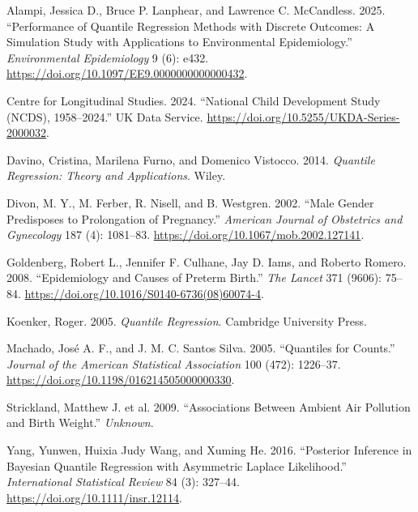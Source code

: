 \documentclass[
  letterpaper,
  DIV=11,
  numbers=noendperiod]{scrartcl}
\newlength{\cslhangindent}
\newenvironment{CSLReferences}[2] %
 {\begin{list}{}{%
  \setlength{\itemindent}{0pt}
  \setlength{\leftmargin}{0pt}
  \setlength{\parsep}{0pt}
  \ifodd #1
   \setlength{\leftmargin}{\cslhangindent}
   \setlength{\itemindent}{-1\cslhangindent}
  \fi
  \setlength{\itemsep}{#2\baselineskip}}}
 {\end{list}}
\begin{document}
\protect{}\label{refs}
\begin{CSLReferences}{1}{1}
Alampi, Jessica D., Bruce P. Lanphear, and Lawrence C. McCandless. 2025.
{``Performance of Quantile Regression Methods with Discrete Outcomes: A
Simulation Study with Applications to Environmental Epidemiology.''}
\emph{Environmental Epidemiology} 9 (6): e432.
\url{https://doi.org/10.1097/EE9.0000000000000432}.

Centre for Longitudinal Studies. 2024. {``National Child Development
Study (NCDS), 1958--2024.''} UK Data Service.
\url{https://doi.org/10.5255/UKDA-Series-2000032}.

Davino, Cristina, Marilena Furno, and Domenico Vistocco. 2014.
\emph{Quantile Regression: Theory and Applications}. Wiley.

Divon, M. Y., M. Ferber, R. Nisell, and B. Westgren. 2002. {``Male
Gender Predisposes to Prolongation of Pregnancy.''} \emph{American
Journal of Obstetrics and Gynecology} 187 (4): 1081--83.
\url{https://doi.org/10.1067/mob.2002.127141}.

Goldenberg, Robert L., Jennifer F. Culhane, Jay D. Iams, and Roberto
Romero. 2008. {``Epidemiology and Causes of Preterm Birth.''} \emph{The
Lancet} 371 (9606): 75--84.
\url{https://doi.org/10.1016/S0140-6736(08)60074-4}.

Koenker, Roger. 2005. \emph{Quantile Regression}. Cambridge University
Press.

Machado, José A. F., and J. M. C. Santos Silva. 2005. {``Quantiles for
Counts.''} \emph{Journal of the American Statistical Association} 100
(472): 1226--37. \url{https://doi.org/10.1198/016214505000000330}.

{Strickland, Matthew J. et al.} 2009. {``Associations Between Ambient
Air Pollution and Birth Weight.''} \emph{Unknown}.

Yang, Yunwen, Huixia Judy Wang, and Xuming He. 2016. {``Posterior
Inference in Bayesian Quantile Regression with Asymmetric Laplace
Likelihood.''} \emph{International Statistical Review} 84 (3): 327--44.
\url{https://doi.org/10.1111/insr.12114}.

\end{CSLReferences}
\end{document}
